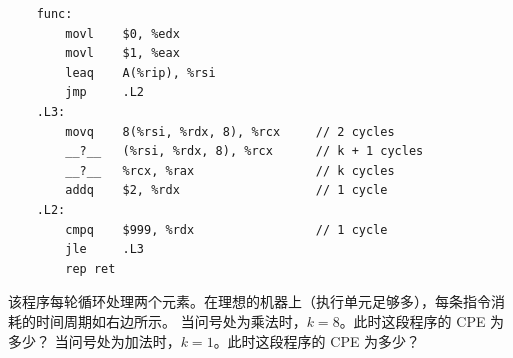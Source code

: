 \begin{problems}
        \begin{verbatim}
    func:
        movl    $0, %edx
        movl    $1, %eax
        leaq    A(%rip), %rsi
        jmp     .L2
    .L3:
        movq    8(%rsi, %rdx, 8), %rcx     // 2 cycles
        __?__   (%rsi, %rdx, 8), %rcx      // k + 1 cycles
        __?__   %rcx, %rax                 // k cycles
        addq    $2, %rdx                   // 1 cycle
    .L2:
        cmpq    $999, %rdx                 // 1 cycle
        jle     .L3
        rep ret
        \end{verbatim}
        该程序每轮循环处理两个元素。在理想的机器上（执行单元足够多），每条指令消耗的时间周期如右边所示。
            \qn 当问号处为乘法时，$k=8$。此时这段程序的 CPE 为多少？
            \qn 当问号处为加法时，$k=1$。此时这段程序的 CPE 为多少？
    \end{problems}

